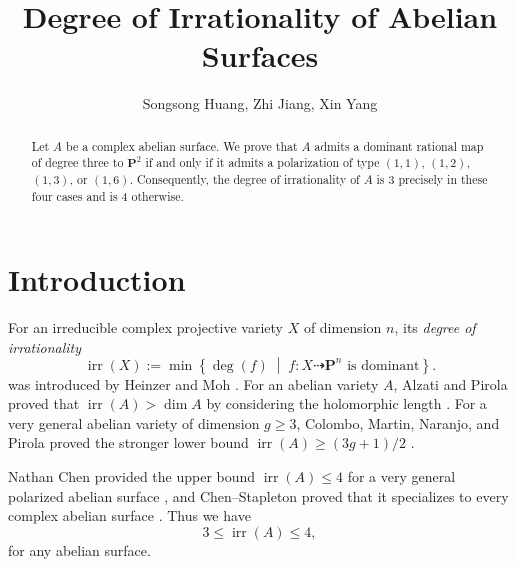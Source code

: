 \documentclass[12pt]{amsart}
\title[Degree of irrationality of abelian surfaces]
{Degree of Irrationality of Abelian Surfaces}
\author{Songsong Huang, Zhi Jiang, Xin Yang}
\date{}
\numberwithin{equation}{section}
\theoremstyle{definition}
\theoremstyle{remark}
\newcommand{\PP}{\mathbf P}
\newcommand{\irr}{\operatorname{irr}}
\begin{document}
\begin{abstract}
Let $A$ be a complex abelian surface.  We prove that $A$ admits a
dominant rational map of degree three to $\PP^2$ if and only if it
admits a polarization of type $(1,1)$, $(1,2)$, $(1,3)$, or $(1,6)$.
Consequently, the degree of irrationality of $A$ is $3$ precisely in
these four cases and is $4$ otherwise. 
\end{abstract}

\maketitle
\setcounter{tocdepth}{1}
\tableofcontents

\section{Introduction}

For an irreducible complex projective variety $X$ of dimension $n$, its
\emph{degree of irrationality}  
\[
  \irr(X):=\min\left\{\deg(f)\;\middle|\;
  f:X\dashrightarrow\PP^n\text{ is dominant}\right\}.
\]
 was introduced by Heinzer and Moh \cite{HeinzerMoh}.
For an abelian variety $A$,  Alzati and Pirola 
 proved that $\irr(A)>\dim A$ by considering the holomorphic length
\cite{AlzatiPirola}.  For a very general abelian variety of dimension
$g\geq3$, Colombo, Martin, Naranjo, and Pirola  proved the stronger lower
bound $\irr(A)\geq(3g+1)/2$ \cite[Corollary~1.2]{CMNP}.

 Nathan Chen provided the
upper bound $\irr(A)\leq 4$ for a very general polarized abelian surface
\cite[Theorem~1.1]{Chen}, and Chen--Stapleton proved that it specializes
to every complex abelian surface \cite[Corollary~D]{ChenStapleton}. Thus we have
\begin{equation}\label{eq:universal-bounds}
                         3\leq\irr(A)\leq4,
\end{equation}
for any abelian surface.
 
\end{document}
